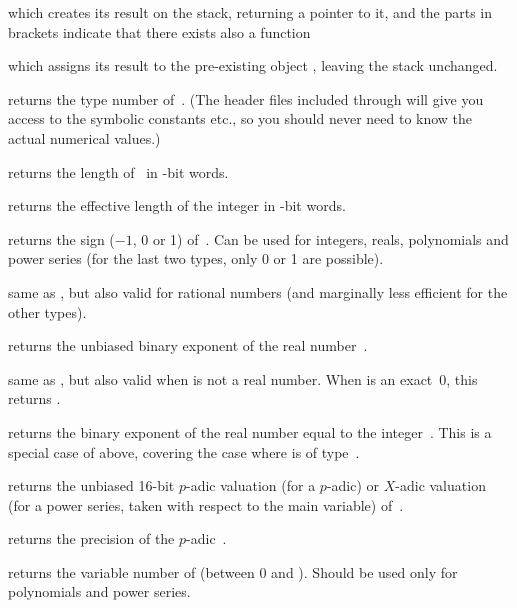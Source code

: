 
\noindent which creates its result on the stack, returning a  pointer
to it, and the parts in brackets indicate that there exists also a function


\noindent which assigns its result to the pre-existing object
, leaving the stack unchanged.


 returns the type number of~. (The header files
included through  will give you access to the symbolic constants
 etc., so you should never need to know the actual numerical values.)

 returns the length of~ in \B-bit words.

 returns the effective length of the integer 
in \B-bit words.

 returns the sign ($-1$, 0 or 1) of~. Can be
used for integers, reals, polynomials and power series (for the last two
types, only 0 or 1 are possible).

 same as , but also valid for rational
numbers (and marginally less efficient for the other types).

 returns the unbiased binary exponent of the real
number~.

 same as , but also valid when 
is not a real number. When  is an exact~0, this returns
\hbox{}.

 returns the binary exponent of the real number equal
to the integer~. This is a special case of  above, covering
the case where  is of type~.

 returns the unbiased 16-bit $p$-adic valuation (for
a $p$-adic) or $X$-adic valuation (for a power series, taken with respect
to the main variable) of~.

 returns the precision of the $p$-adic~.

 returns the variable number of  (between 0 and
). Should be used only for polynomials and power series.

